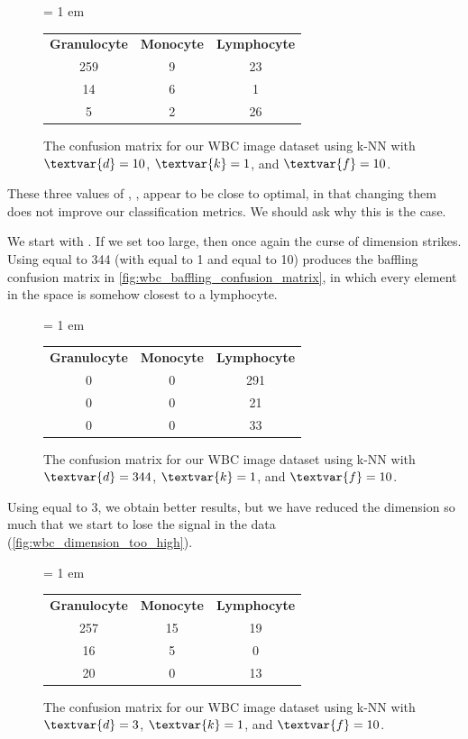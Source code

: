 \begin{figure}[h]
\centering
\tabcolsep = 1 em
\mySfFamily
\begin{tabular}{c c c}
\textbf{Granulocyte} & \textbf{Monocyte} & \textbf{Lymphocyte} \\
259 & 9 & 23 \\
14 & 6 & 1 \\
5 & 2 & 26
\end{tabular}
\caption{The confusion matrix for our WBC image dataset using k-NN with $\textvar{d} = \text{10}$, $\textvar{k} = \text{1}$, and $\textvar{f} = \text{10}$.}
\label{fig:wbc_better_confusion_matrix}
\end{figure}

These three values of , ,  appear to be close to optimal, in that changing them does not improve our classification metrics. We should ask why this is the case.

We start with . If we set  too large, then once again the curse of dimension strikes. Using  equal to 344 (with  equal to 1 and  equal to 10) produces the baffling confusion matrix in \autoref{fig:wbc_baffling_confusion_matrix}, in which every element in the space is somehow closest to a lymphocyte.

\begin{figure}[h]
\centering
\tabcolsep = 1 em
\mySfFamily
\begin{tabular}{c c c}
\textbf{Granulocyte} & \textbf{Monocyte} & \textbf{Lymphocyte} \\
0 & 0 & 291 \\
0 & 0 & 21 \\
0 & 0 & 33
\end{tabular}
\caption{The confusion matrix for our WBC image dataset using k-NN with $\textvar{d} = \text{344}$, $\textvar{k} = \text{1}$, and $\textvar{f} = \text{10}$.}
\label{fig:wbc_baffling_confusion_matrix}
\end{figure}

Using  equal to 3, we obtain better results, but we have reduced the dimension so much that we start to lose the signal in the data (\autoref{fig:wbc_dimension_too_high}).\\

\begin{figure}[h]
\centering
\tabcolsep = 1 em
\mySfFamily
\begin{tabular}{c c c}
\textbf{Granulocyte} & \textbf{Monocyte} & \textbf{Lymphocyte} \\
257 & 15 & 19 \\
16 & 5 & 0 \\
20 & 0 & 13
\end{tabular}
\caption{The confusion matrix for our WBC image dataset using k-NN with $\textvar{d} = \text{3}$, $\textvar{k} = \text{1}$, and $\textvar{f} = \text{10}$.}
\label{fig:wbc_dimension_too_high}
\end{figure}

